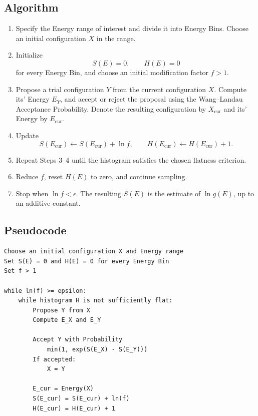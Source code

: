 \documentclass[a4paper, 10pt, onepage]{elegantbook}
\begin{document}
{\subsection{Algorithm}

\begin{enumerate}
  \item Specify the Energy range of interest and divide it into Energy
        Bins. Choose an initial configuration \(X\) in the range.
  \item Initialize
        \[
          S(E)=0,\qquad H(E)=0
        \]
        for every Energy Bin, and choose an initial modification factor
        \(f>1\).
  \item Propose a trial configuration \(Y\) from the current
        configuration \(X\). Compute its' Energy \(E_Y\), and accept or
        reject the proposal using the Wang--Landau Acceptance
        Probability. Denote the resulting configuration by
        \(X_{\mathrm{cur}}\) and its' Energy by \(E_{\mathrm{cur}}\).
  \item Update
        \[
          S(E_{\mathrm{cur}})
          \leftarrow S(E_{\mathrm{cur}})+\ln f,
          \qquad
          H(E_{\mathrm{cur}})
          \leftarrow H(E_{\mathrm{cur}})+1.
        \]
  \item Repeat Steps 3--4 until the histogram satisfies the chosen
        flatness criterion.
  \item Reduce \(f\), reset \(H(E)\) to zero, and continue sampling.
  \item Stop when \(\ln f<\epsilon\). The resulting \(S(E)\) is the
        estimate of \(\ln g(E)\), up to an additive constant.
\end{enumerate}

\subsection{Pseudocode}

\begin{verbatim}
Choose an initial configuration X and Energy range
Set S(E) = 0 and H(E) = 0 for every Energy Bin
Set f > 1

while ln(f) >= epsilon:
    while histogram H is not sufficiently flat:
        Propose Y from X
        Compute E_X and E_Y

        Accept Y with Probability
            min(1, exp(S(E_X) - S(E_Y)))
        If accepted:
            X = Y

        E_cur = Energy(X)
        S(E_cur) = S(E_cur) + ln(f)
        H(E_cur) = H(E_cur) + 1


\end{verbatim}}
\end{document}
